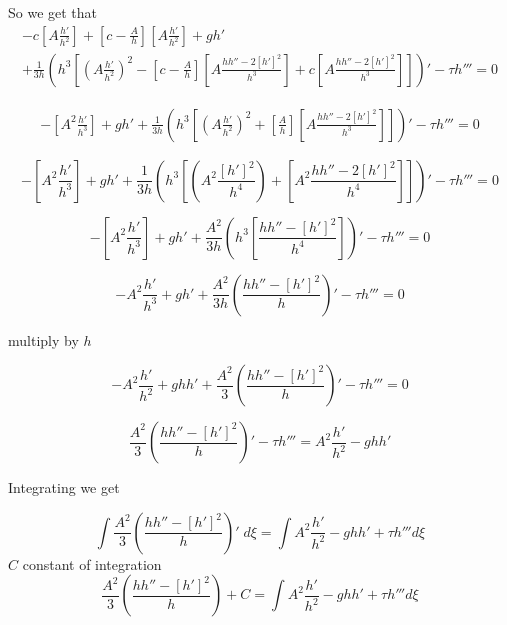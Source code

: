 \documentclass[subeqn]{article}
\begin{document}
So we get that
\begin{multline*}
-c\left[A \frac{h'}{h^2}\right] + \left[ c - \frac{A}{h}\right] \left[A \frac{h'}{h^2}\right]  + gh' \\ + \frac{1}{3h} \left({h^3}\left[\left(A \frac{h'}{h^2} \right)^2 - \left[ c - \frac{A}{h}\right]\left[A \frac{h h'' - 2\left[h'\right]^2}{h^3}\right] + c \left[A \frac{h h'' - 2\left[h'\right]^2}{h^3}\right] \right]\right)'  - \tau h'''  = 0 \end{multline*}

\begin{multline*}
-\left[A^2 \frac{h'}{h^3}\right]  + gh'  + \frac{1}{3h} \left({h^3}\left[\left(A \frac{h'}{h^2} \right)^2 + \left[ \frac{A}{h}\right]\left[A \frac{h h'' - 2\left[h'\right]^2}{h^3}\right] \right] \right)'  - \tau h'''  = 0 \end{multline*}

\begin{equation*}
-\left[A^2 \frac{h'}{h^3}\right]  + gh'  + \frac{1}{3h} \left({h^3}\left[\left(A^2 \frac{\left[h'\right]^2}{h^4} \right) + \left[A^2 \frac{h h'' - 2\left[h'\right]^2}{h^4}\right] \right]\right)'  - \tau h'''  = 0 
\end{equation*}

\begin{equation*}
-\left[A^2 \frac{h'}{h^3}\right]  + gh'  + \frac{A^2}{3h} \left({h^3}\left[\frac{h h'' - \left[h'\right]^2}{h^4} \right] \right)'  - \tau h'''  = 0 
\end{equation*}

\begin{equation*}
-A^2 \frac{h'}{h^3}  + gh'  + \frac{A^2}{3h} \left(\frac{h h'' - \left[h'\right]^2}{h}  \right)'  - \tau h'''  = 0 
\end{equation*}

multiply by $h$

\begin{equation*}
-A^2 \frac{h'}{h^2}  + ghh'  + \frac{A^2}{3} \left(\frac{h h'' - \left[h'\right]^2}{h} \right)'  - \tau h'''  = 0 
\end{equation*}

\begin{equation*}
\frac{A^2}{3} \left(\frac{h h'' - \left[h'\right]^2}{h} \right)'  - \tau h'''  = A^2 \frac{h'}{h^2} - ghh'
\end{equation*}

Integrating we get

\begin{equation*}
\int \frac{A^2}{3} \left(\frac{h h'' - \left[h'\right]^2}{h}  \right)' \; d \xi =  \int A^2 \frac{h'}{h^2} - ghh'  + \tau h'''   d \xi
\end{equation*}
$C$ constant of integration
\begin{equation*}
 \frac{A^2}{3} \left(\frac{h h'' - \left[h'\right]^2}{h}  \right) + C  =  \int A^2 \frac{h'}{h^2} - ghh' + \tau h'''  d \xi
\end{equation*}
\end{document}
